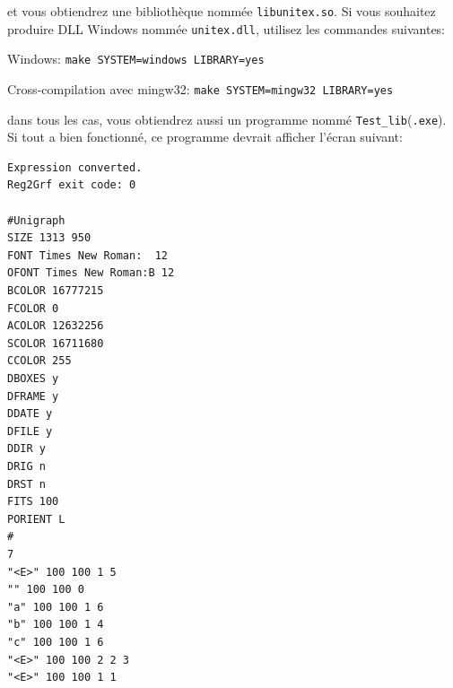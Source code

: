 \bigskip
\noindent et vous obtiendrez une bibliothèque nommée \verb+libunitex.so+. Si vous souhaitez produire 
DLL Windows nommée \verb+unitex.dll+, utilisez les commandes suivantes:

\bigskip
Windows: \verb+make SYSTEM=windows LIBRARY=yes+

Cross-compilation avec mingw32: \verb+make SYSTEM=mingw32 LIBRARY=yes+

\bigskip
\noindent dans tous les cas, vous obtiendrez aussi un programme nommé
\verb+Test_lib+(\verb+.exe+). Si tout a bien fonctionné, ce programme devrait afficher l'écran
suivant:

\begin{verbatim}
Expression converted.
Reg2Grf exit code: 0

#Unigraph
SIZE 1313 950
FONT Times New Roman:  12
OFONT Times New Roman:B 12
BCOLOR 16777215
FCOLOR 0
ACOLOR 12632256
SCOLOR 16711680
CCOLOR 255
DBOXES y
DFRAME y
DDATE y
DFILE y
DDIR y
DRIG n
DRST n
FITS 100
PORIENT L
#
7
"<E>" 100 100 1 5
"" 100 100 0
"a" 100 100 1 6
"b" 100 100 1 4
"c" 100 100 1 6
"<E>" 100 100 2 2 3
"<E>" 100 100 1 1
\end{verbatim}
